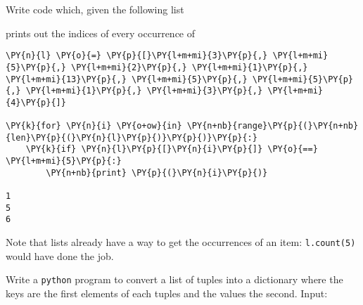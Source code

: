 \begin{Exercise}
Write code which, given the following list

\begin{Shaded}
\begin{Highlighting}[]
\OperatorTok{=}\NormalTok{ [}\NormalTok{, }\NormalTok{, }\NormalTok{, }\NormalTok{, }\NormalTok{, }\NormalTok{, }\NormalTok{, }\NormalTok{, }\NormalTok{, }\NormalTok{]}
\end{Highlighting}
\end{Shaded}
prints out the indices of every occurrence of
\begin{Shaded}
\begin{Highlighting}[]
\OperatorTok{=} 
\end{Highlighting}
\end{Shaded}
\end{Exercise}

\begin{Answer}
\begin{tcolorbox}[size=fbox, boxrule=1pt, colback=cellbackground, colframe=cellborder]
\begin{Verbatim}[commandchars=\\\{\}]
\PY{n}{l} \PY{o}{=} \PY{p}{[}\PY{l+m+mi}{3}\PY{p}{,} \PY{l+m+mi}{5}\PY{p}{,} \PY{l+m+mi}{2}\PY{p}{,} \PY{l+m+mi}{1}\PY{p}{,} \PY{l+m+mi}{13}\PY{p}{,} \PY{l+m+mi}{5}\PY{p}{,} \PY{l+m+mi}{5}\PY{p}{,} \PY{l+m+mi}{1}\PY{p}{,} \PY{l+m+mi}{3}\PY{p}{,} \PY{l+m+mi}{4}\PY{p}{]}

\PY{k}{for} \PY{n}{i} \PY{o+ow}{in} \PY{n+nb}{range}\PY{p}{(}\PY{n+nb}{len}\PY{p}{(}\PY{n}{l}\PY{p}{)}\PY{p}{)}\PY{p}{:}
    \PY{k}{if} \PY{n}{l}\PY{p}{[}\PY{n}{i}\PY{p}{]} \PY{o}{==} \PY{l+m+mi}{5}\PY{p}{:}
        \PY{n+nb}{print} \PY{p}{(}\PY{n}{i}\PY{p}{)}

1
5
6
\end{Verbatim}
\end{tcolorbox}

Note that lists already have a way to get the occurrences of an item: \texttt{l.count(5)} would have done the job.
\end{Answer}

\begin{Exercise}
Write a \texttt{python} program to convert a list of tuples into a dictionary where the keys are the first elements of each tuples and the values the second.
Input:
\begin{Shaded}
\begin{Highlighting}[]
\OperatorTok{=}\NormalTok{ [(}\NormalTok{, }\NormalTok{), (}\NormalTok{, }\NormalTok{), (}\NormalTok{, }\NormalTok{), (}\NormalTok{, }\NormalTok{), (}\NormalTok{, }\NormalTok{), (}\NormalTok{, }\NormalTok{)]}
\end{Highlighting}
\end{Shaded}
\end{Exercise}

